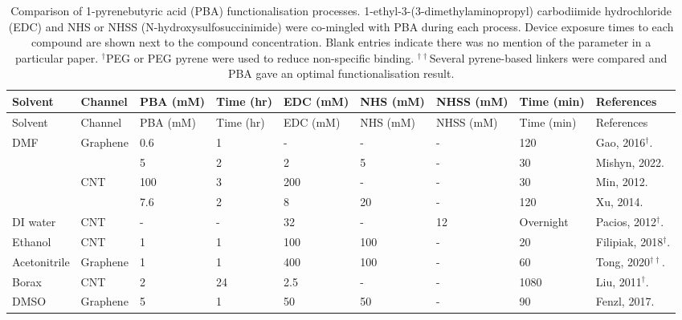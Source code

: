 \documentclass[
  a4paper,
]{scrbook}
\begin{document}
\begin{landscape}
\begin{center}

\hypertarget{tbl-pba-functionalisation}{}
\begin{longtable}[]{@{}lllllllll@{}}
\caption{\label{tbl-pba-functionalisation}Comparison of 1-pyrenebutyric
acid (PBA) functionalisation processes.
1-ethyl-3-(3-dimethylaminopropyl) carbodiimide hydrochloride (EDC) and
NHS or NHSS (N-hydroxysulfosuccinimide) were co-mingled with PBA during
each process. Device exposure times to each compound are shown next to
the compound concentration. Blank entries indicate there was no mention
of the parameter in a particular paper. \(^†\)PEG or PEG pyrene were
used to reduce non-specific binding. \(^{††}\)Several pyrene-based
linkers were compared and PBA gave an optimal functionalisation
result.}\tabularnewline
\toprule\noalign{}
Solvent & Channel & PBA (mM) & Time (hr) & EDC (mM) & NHS (mM) & NHSS
(mM) & Time (min) & References \\
\midrule\noalign{}
\endfirsthead
\toprule\noalign{}
Solvent & Channel & PBA (mM) & Time (hr) & EDC (mM) & NHS (mM) & NHSS
(mM) & Time (min) & References \\
\midrule\noalign{}
\endhead
\bottomrule\noalign{}
\endlastfoot
DMF & Graphene & 0.6 & 1 & - & - & - & 120 & Gao, 2016\(^†\).
\cite{Gao2016} \\
& & 5 & 2 & 2 & 5 & - & 30 & Mishyn, 2022. \cite{Mishyn2022} \\
& CNT & 100 & 3 & 200 & - & - & 30 & Min, 2012. \cite{Min2012} \\
& & 7.6 & 2 & 8 & 20 & - & 120 & Xu, 2014. \cite{Xu2014} \\
DI water & CNT & - & - & 32 & - & 12 & Overnight & Pacios, 2012\(^†\).
\cite{Pacios2012} \\
Ethanol & CNT & 1 & 1 & 100 & 100 & - & 20 & Filipiak, 2018\(^†\).
\cite{Filipiak2018} \\
Acetonitrile & Graphene & 1 & 1 & 400 & 100 & - & 60 & Tong,
2020\(^{††}\). \cite{Tong2020} \\
Borax & CNT & 2 & 24 & 2.5 & - & - & 1080 & Liu, 2011\(^†\).
\cite{Liu2011} \\
DMSO & Graphene & 5 & 1 & 50 & 50 & - & 90 & Fenzl, 2017.
\cite{Fenzl2017} \\
\end{longtable}

\end{center}
\end{landscape}
\restoregeometry %
\end{document}
